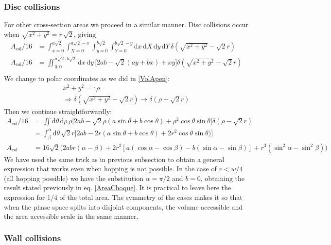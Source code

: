 \documentclass[superscriptaddress,pre,reprint,showpacs,onecolumn]{revtex4-1}
\newcommand{\rd}[1]{\mathrm{d}{#1} \,}
\begin{document}
  \subsubsection{Disc collisions}
  For other cross-section areas we proceed in a similar manner. 
  Disc collisions occur when $\sqrt{x^2 + y^2} = r \, \sqrt{2}$, giving
  \begin{align}
    A_\text{col}/16 & =\int_{x=0}^{a\sqrt{2}} \int_{X=0}^{a\sqrt{2}-x} \int_{y=0}^{b\sqrt{2}} \int_{Y=0}^{b\sqrt{2}-y}
    \rd x \rd X \rd y \rd Y
    \delta (\sqrt{x^2+y^2}-\sqrt{2}r)\\
    A_\text{col}/16 & =\iint _{0,0}^{a\sqrt{2},b\sqrt{2}}
    \rd x \rd y 
   \bigl[ 2ab-\sqrt{2}(ay+bx)+xy \bigr]
    \delta (\sqrt{x^2+y^2}-\sqrt{2}r)\\
    \end{align}
  We change to polar coordinates as we did in \ref{VolApen}:
  \begin{align}
    x^2+y^2 =: \rho \\   \Rightarrow   \delta(\sqrt{x^2+y^2}-\sqrt{2}r) \rightarrow
    \delta(\rho-\sqrt{2}r)   
    \end{align}
  Then we continue straightforwardly:
    \begin{align}
    A_\text{col}/16 & =\iint 
    \rd \theta \rd \rho \rho
    \bigl[2ab-\sqrt{2}\rho(a\sin\theta+b\cos\theta)+\rho^2\cos\theta\sin\theta
      \bigr]
    \delta(\rho-\sqrt{2}r) \\
    &=\int_\beta^\alpha \rd \theta \sqrt{2}r
    \bigl[
      2ab-2r(a\sin\theta+b\cos\theta)+2r^2\cos\theta\sin\theta)
      \bigr] \\
    A_\text{col} & = 16\sqrt{2} \bigl( 2abr(\alpha-\beta)
    + 2r^2 [a (\cos \alpha-\cos\beta) -b (\sin\alpha -\sin\beta)]
     + r^3(\sin^2 \alpha -\sin^2\beta) \bigr)
    \end{align}
    We have used the same trick as in previous subsection to obtain a general expression
    that works even when hopping is not possible. In the case of $r<w/4$ (all hopping possible)
    we have the substitution $\alpha=\pi/2$ and $b=0$, obtaining the result stated previously
    in eq. \ref{AreaChoque}. It is practical to leave here the expression for 1/4 of the
    total area. The symmetry of the cases makes it so that when the phase space splits
    into disjoint components, the volume accessible and the area accessible scale in
    the same manner.
    
    \subsubsection{Wall collisions}
\end{document}
